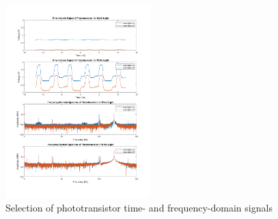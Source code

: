\documentclass[conference]{IEEEtran}
\begin{document}
\begin{figure}[htbp]
	\centerline{\includegraphics[width=0.5\textwidth]{sensor-matlab.png}}
	\caption{Selection of phototransistor time- and frequency-domain signals}
	\label{fig:sensor-matlab}
\end{figure}
\end{document}
